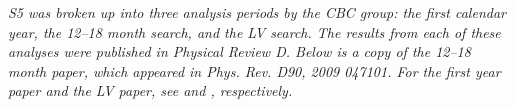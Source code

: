 \textit{\ac{S5} was broken up into three analysis periods by the \ac{CBC} group: the first calendar year, the 12--18 month search, and the LV search. The results from each of these analyses were published in Physical Review D. Below is a copy of the 12--18 month paper, which appeared in Phys. Rev. D90, 2009 047101. For the first year paper and the LV paper, see \cite{ref:s51yr} and \cite{ref:s5lvc}, respectively.}

\def\BNSul{\ensuremath{1.4 \times 10^{-2}}}
\def\NSBHul{\ensuremath{3.6 \times 10^{-3}}}
\def\BBHul{\ensuremath{7.3 \times 10^{-4}}}

\def\SNSBHul{\ensuremath{4.4 \times 10^{-3}}}
\def\SBBHul{\ensuremath{9.0 \times 10^{-4}}}

\def\BNStripleCumLum{\ensuremath{490}}
\def\BNSHoneLoneCumLum{\ensuremath{410}}
\def\BNSHtwoLoneCumLum{\ensuremath{110}}

\def\BNStripleCalErr{\ensuremath{23\%}}
\def\BNSHoneLoneCalErr{\ensuremath{23\%}}
\def\BNSHtwoLoneCalErr{\ensuremath{26\%}}

\def\BNStripleMonErr{\ensuremath{3\%}}
\def\BNSHoneLoneMonErr{\ensuremath{7\%}}
\def\BNSHtwoLoneMonErr{\ensuremath{10\%}}

\def\BNStripleWavErr{\ensuremath{31\%}}
\def\BNSHoneLoneWavErr{\ensuremath{32\%}}
\def\BNSHtwoLoneWavErr{\ensuremath{31\%}}

\def\BNStripleGDErr{\ensuremath{16\%}}
\def\BNSHoneLoneGDErr{\ensuremath{16\%}}
\def\BNSHtwoLoneGDErr{\ensuremath{3\%}}

\def\BNStripleGMErr{\ensuremath{19\%}}
\def\BNSHoneLoneGMErr{\ensuremath{19\%}}
\def\BNSHtwoLoneGMErr{\ensuremath{17\%}}

\def\BBHtripleCumLum{\ensuremath{11000}}
\def\BBHHoneLoneCumLum{\ensuremath{9400}}
\def\BBHHtwoLoneCumLum{\ensuremath{2200}}

\def\BBHtripleCalErr{\ensuremath{25\%}}
\def\BBHHoneLoneCalErr{\ensuremath{24\%}}
\def\BBHHtwoLoneCalErr{\ensuremath{31\%}}

\def\BBHtripleMonErr{\ensuremath{3\%}}
\def\BBHHoneLoneMonErr{\ensuremath{7\%}}
\def\BBHHtwoLoneMonErr{\ensuremath{10\%}}

\def\BBHtripleWavErr{\ensuremath{33\%}}
\def\BBHHoneLoneWavErr{\ensuremath{34\%}}
\def\BBHHtwoLoneWavErr{\ensuremath{38\%}}

